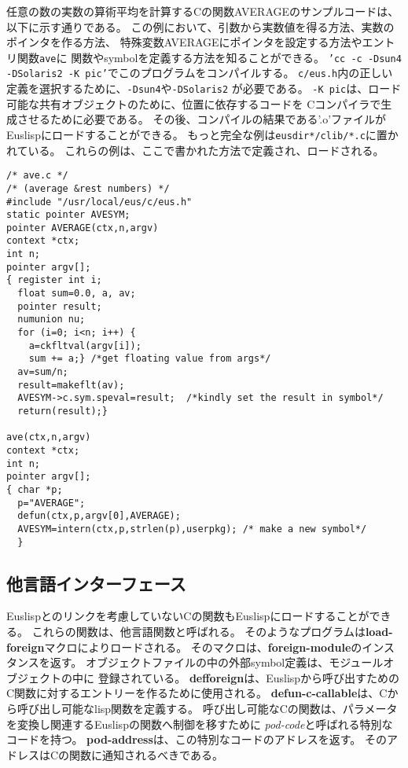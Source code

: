 任意の数の実数の算術平均を計算するCの関数AVERAGEのサンプルコードは、
以下に示す通りである。
この例において、引数から実数値を得る方法、実数のポインタを作る方法、
特殊変数AVERAGEにポインタを設定する方法やエントリ関数{\tt ave}に
関数やsymbolを定義する方法を知ることができる。
{\tt 'cc -c -Dsun4 -DSolaris2 -K pic'}でこのプログラムをコンパイルする。
{\tt c/eus.h}内の正しい定義を選択するために、{\tt -Dsun4}や{\tt -DSolaris2}
が必要である。
{\tt -K pic}は、ロード可能な共有オブジェクトのために、位置に依存するコードを
Cコンパイラで生成させるために必要である。
その後、コンパイルの結果である'.o'ファイルがEuslispにロードすることができる。
もっと完全な例は{\tt *eusdir*/clib/*.c}に置かれている。
これらの例は、ここで書かれた方法で定義され、ロードされる。

\begin{verbatim}
/* ave.c */
/* (average &rest numbers) */
#include "/usr/local/eus/c/eus.h"
static pointer AVESYM;
pointer AVERAGE(ctx,n,argv)
context *ctx;
int n;
pointer argv[];
{ register int i;
  float sum=0.0, a, av;
  pointer result;
  numunion nu;
  for (i=0; i<n; i++) {
    a=ckfltval(argv[i]);
    sum += a;} /*get floating value from args*/
  av=sum/n;
  result=makeflt(av);
  AVESYM->c.sym.speval=result;  /*kindly set the result in symbol*/
  return(result);}

ave(ctx,n,argv)
context *ctx;
int n;
pointer argv[];
{ char *p;
  p="AVERAGE";
  defun(ctx,p,argv[0],AVERAGE);
  AVESYM=intern(ctx,p,strlen(p),userpkg); /* make a new symbol*/
  }

\end{verbatim}

\subsection{他言語インターフェース}

Euslispとのリンクを考慮していないCの関数もEuslispにロードすることができる。
これらの関数は、他言語関数と呼ばれる。
そのようなプログラムは{\bf load-foreign}マクロによりロードされる。
そのマクロは、{\bf foreign-module}のインスタンスを返す。
オブジェクトファイルの中の外部symbol定義は、モジュールオブジェクトの中に
登録されている。
{\bf defforeign}は、Euslispから呼び出すための
C関数に対するエントリーを作るために使用される。
{\bf defun-c-callable}は、Cから呼び出し可能なlisp関数を定義する。
呼び出し可能なCの関数は、パラメータを変換し関連するEuslispの関数へ制御を移すために
{\em pod-code}と呼ばれる特別なコードを持つ。
{\bf pod-address}は、この特別なコードのアドレスを返す。
そのアドレスはCの関数に通知されるべきである。

